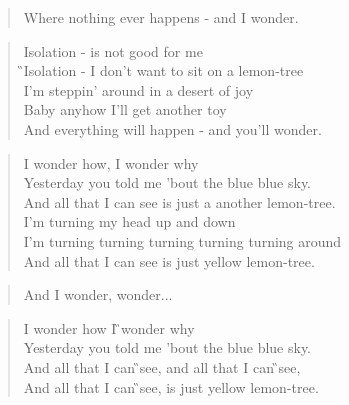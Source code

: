\documentclass[9pt,a4paper,oneside, onecolumn]{article}
\begin{document}
\begin{multicols}{2}
\begin{small}
\begin{verse}
Where nothing ever happens - and I wonder.\\
\end{verse}
\begin{verse}
\E{}Isolation - \Am{}is not good for me\\
\G{}Isolation - \C{}I don't want to sit on a \E{}lemon-tree\\
I'm \Am{}steppin' around in a \Em{}desert of joy\\
\Am{}Baby anyhow I'll get an\Em{}other toy\\
And \Dms{}everything will \Em{}happen - and you'll \Am{}wonder.\qquad{}\\
\end{verse}
\begin{verse}
I wonder how, I wonder why\\
Yesterday you told me 'bout the blue blue sky.\\
And all that I can see is just a another lemon-tree.\\
I'm turning my head up and down\\
I'm turning turning turning turning turning around\\
And all that I can see is just yellow lemon-tree.\\
\end{verse}
\begin{verse}
And I wonder, wonder...\\
\end{verse}
\begin{verse}
I \C{}wonder how I \G{}wonder why\\
\Am{}Yesterday you told me 'bout the \Em{}blue blue sky.\\
And \F{}all that I can \G{}see, and \F{}all that I can \G{}see,\\
And \F{}all that I can \G{}see, is \Gs{}just yellow \C{}lemon-tree.\\

\end{verse}

\end{small}
\end{multicols}
\end{document}
